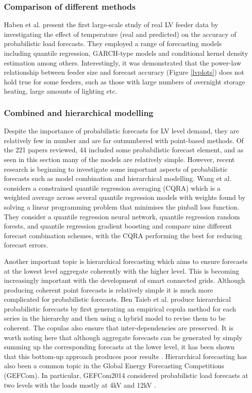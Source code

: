 \subsubsection{Comparison of different methods}
Haben et al. \cite{Haben2019stl} present the first large-scale study of real LV feeder data by investigating the effect of temperature (real and predicted) on the accuracy of probabilistic load forecasts. They employed a range of forecasting models including quantile regression, GARCH-type models and conditional kernel density estimation among others. Interestingly, it was demonstrated that the power-law relationship between feeder size and forecast accuracy (Figure \ref{lvplots}) does not hold true for some feeders, such as those with large numbers of overnight storage heating, large amounts of lighting etc.

\subsubsection{Combined and hierarchical modelling}
Despite the importance of probabilistic forecasts for LV level demand, they are relatively few in number and are far outnumbered with point-based methods. Of the 221 papers reviewed, 44 included some probabilistic forecast element, and as seen in this section many of the models are relatively simple.  However, recent research is beginning to investigate some important aspects of probabilistic forecasts such as model combination and hierarchical modelling. Wang et al. \cite{Wang2019cpl} considers a constrained quantile regression averaging (CQRA) which is a weighted average across several quantile regression models with weights found by solving a linear programming problem that minimises the pinball loss function. They consider a quantile regression neural network, quantile regression random forests, and quantile regression gradient boosting and compare nine different forecast combination schemes, with the CQRA performing the best for reducing forecast errors. 

Another important topic is hierarchical forecasting which aims to ensure forecasts at the lowest level aggregate coherently with the higher level. This is becoming increasingly important with the development of smart connected grids. Although producing coherent point forecasts is relatively simple it is much more complicated for probabilistic forecasts. Ben Taieb et al. \cite{Taieb2020hpf} produce hierarchical probabilistic forecasts by first generating an empirical copula method for each series in the hierarchy and then using a hybrid model to revise them to be coherent. The copulas also ensure that inter-dependencies are preserved. It is worth noting here that although aggregate forecasts can be generated by simply summing up the corresponding forecasts at the lower level, it has been shown that this bottom-up approach produces poor results \cite{Hyndman2011ocf}. 
Hierarchical forecasting has also been a common topic in the Global Energy Forecasting Competitions (GEFCom). In particular, GEFCom2014 considered probabilistic load forecasts at two levels with the loads mostly at 4kV and 12kV \cite{Gefcom2014}. 


